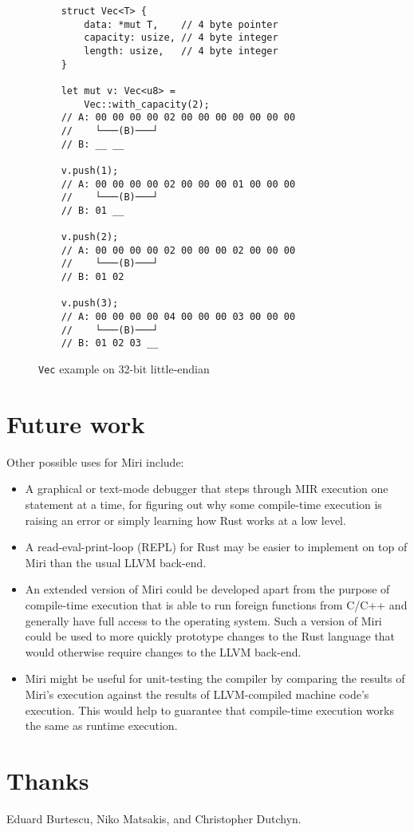 \documentclass[twocolumn]{article}
\newcommand{\rust}[1]{\texttt{#1}}
\begin{document}
\begin{figure}[t]
  \begin{verbatim}
    struct Vec<T> {
        data: *mut T,    // 4 byte pointer
        capacity: usize, // 4 byte integer
        length: usize,   // 4 byte integer
    }

    let mut v: Vec<u8> =
        Vec::with_capacity(2);
    // A: 00 00 00 00 02 00 00 00 00 00 00 00
    //    └───(B)───┘
    // B: __ __

    v.push(1);
    // A: 00 00 00 00 02 00 00 00 01 00 00 00
    //    └───(B)───┘
    // B: 01 __

    v.push(2);
    // A: 00 00 00 00 02 00 00 00 02 00 00 00
    //    └───(B)───┘
    // B: 01 02

    v.push(3);
    // A: 00 00 00 00 04 00 00 00 03 00 00 00
    //    └───(B)───┘
    // B: 01 02 03 __
  \end{verbatim}
  \caption{\rust{Vec} example on 32-bit little-endian}
\end{figure}


\section{Future work}

Other possible uses for Miri include:

\begin{itemize}
  \item A graphical or text-mode debugger that steps through MIR execution one statement at a time,
    for figuring out why some compile-time execution is raising an error or simply learning how Rust
    works at a low level.
  \item A read-eval-print-loop (REPL) for Rust may be easier to implement on top of Miri than the
    usual LLVM back-end.
  \item An extended version of Miri could be developed apart from the purpose of compile-time
    execution that is able to run foreign functions from C/C++ and generally have full access to the
    operating system. Such a version of Miri could be used to more quickly prototype changes to the
    Rust language that would otherwise require changes to the LLVM back-end.
  \item Miri might be useful for unit-testing the compiler by comparing the results of Miri's
    execution against the results of LLVM-compiled machine code's execution. This would help to
    guarantee that compile-time execution works the same as runtime execution.
\end{itemize}


\section{Thanks}

Eduard Burtescu, Niko Matsakis, and Christopher Dutchyn.
\end{document}
